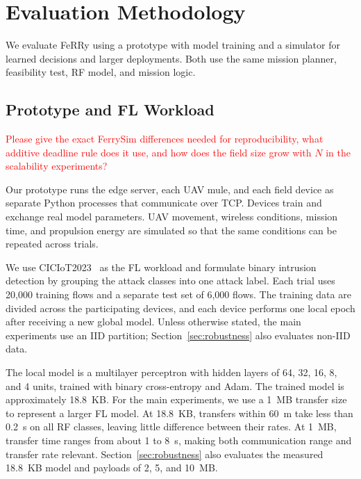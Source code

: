 \documentclass[conference]{IEEEtran}
\newcommand{\sysname}{FeRRy}
\begin{document}
\section{Evaluation Methodology}
\label{sec:evaluation}
We evaluate \sysname{} using a prototype with model training and a simulator
for learned decisions and larger deployments. Both use the same mission planner, feasibility test, RF model, and mission logic.

\subsection{Prototype and FL Workload}
\label{sec:prototype}

\textcolor{red}{Please give the exact FerrySim differences needed for reproducibility, what additive deadline rule does it use, and how does the field size grow with \(N\) in the scalability experiments?}

Our prototype runs the edge server, each UAV mule, and each field device as
separate Python processes that communicate over TCP. Devices train and exchange
real model parameters. UAV movement, wireless conditions, mission time, and
propulsion energy are simulated so that the same conditions can be repeated
across trials.

We use CICIoT2023~\cite{CiCIoT2023} as the FL workload and formulate binary
intrusion detection by grouping the attack classes into one attack label. Each
trial uses 20,000 training flows and a separate test set of 6,000 flows. The
training data are divided across the participating devices, and each device
performs one local epoch after receiving a new global model. Unless otherwise
stated, the main experiments use an IID partition; Section~\ref{sec:robustness}
also evaluates non-IID data.

The local model is a multilayer perceptron with hidden layers of 64, 32, 16, 8,
and 4 units, trained with binary cross-entropy and Adam. The trained model is
approximately 18.8~KB. For the main experiments, we use a 1~MB transfer size to
represent a larger FL model. At 18.8~KB, transfers within 60~m take less than
0.2~s on all RF classes, leaving little difference between their rates. At
1~MB, transfer time ranges from about 1 to 8~s, making both communication range
and transfer rate relevant. Section~\ref{sec:robustness} also evaluates the
measured 18.8~KB model and payloads of 2, 5, and 10~MB.
\end{document}
